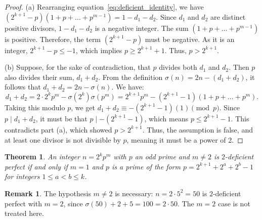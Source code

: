 \documentclass[10pt]{article}
\newtheorem{theorem}{Theorem}
\theoremstyle{definition}
\newtheorem{remark}{Remark}
\begin{document}
\begin{proof}
    (a) Rearranging equation~\eqref{eq:deficient_identity}, we have $(2^{k+1}-p)(1+p+\dots+p^{m-1}) = 1-d_1-d_2$. Since $d_1$ and $d_2$ are distinct positive divisors, $1-d_1-d_2$ is a negative integer. The sum $(1+p+\dots+p^{m-1})$ is positive. Therefore, the term $(2^{k+1}-p)$ must be negative. As it is an integer, $2^{k+1}-p \le -1$, which implies $p \ge 2^{k+1}+1$. Thus, $p > 2^{k+1}$.

    (b) Suppose, for the sake of contradiction, that $p$ divides both $d_1$ and $d_2$. Then $p$ also divides their sum, $d_1+d_2$. From the definition $\sigma(n) = 2n - (d_1+d_2)$, it follows that $d_1+d_2 = 2n - \sigma(n)$. We have:
    \[ d_1+d_2 = 2 \cdot 2^k p^m - \sigma(2^k)\sigma(p^m) = 2^{k+1}p^m - (2^{k+1}-1)(1+p+\dots+p^m). \]
    Taking this modulo $p$, we get $d_1+d_2 \equiv -(2^{k+1}-1)(1) \pmod{p}$. Since $p \mid d_1+d_2$, it must be that $p \mid -(2^{k+1}-1)$, which means $p \le 2^{k+1}-1$. This contradicts part (a), which showed $p > 2^{k+1}$. Thus, the assumption is false, and at least one divisor is not divisible by $p$, meaning it must be a power of 2.
\end{proof}

\begin{theorem}\label{thm:2def_classification}
    An integer $n=2^kp^m$ with $p$ an odd prime and $m \neq 2$ is $2$-deficient perfect if and only if $m=1$ and $p$ is a prime of the form $p=2^{k+1}+2^a+2^b-1$ for integers $1\le a<b\le k$.
\end{theorem}

\begin{remark}
    The hypothesis $m \neq 2$ is necessary: $n = 2 \cdot 5^2 = 50$ is $2$-deficient perfect with $m = 2$, since $\sigma(50) + 2 + 5 = 100 = 2 \cdot 50$. The $m=2$ case is not treated here.
\end{remark}
\end{document}
